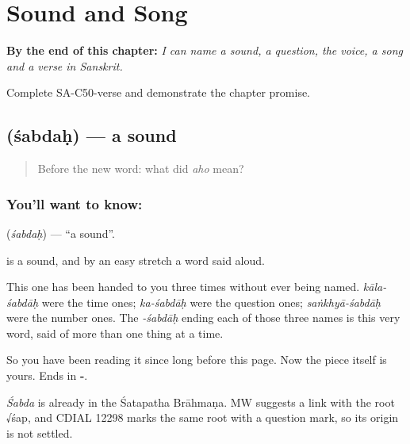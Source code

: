 
\chapter{Sound and Song}
\label{ch:sa-sound-and-song}

\begin{chapteropening}
\textbf{By the end of this chapter:} \emph{I can name a sound, a question, the voice, a song and a verse in Sanskrit.}

Complete SA-C50-verse and demonstrate the chapter promise.
\end{chapteropening}

\section[\texorpdfstring{\sk{शब्दः} (śabdaḥ)}{शब्दः (śabdaḥ)}]{ (śabdaḥ) — a sound}

\label{lesson:SA-C50-sound}



\begin{quote}
Before the new word: what did \emph{aho} mean?
\end{quote}

\subsection*{You'll want to know: }
\textbf{} (\emph{śabdaḥ}) — \textquotedblleft{}a sound\textquotedblright{}.

\textbf{} is a sound, and by an easy stretch a word said aloud.

This one has been handed to you three times without ever being named. \emph{kāla-śabdāḥ} were the time ones; \emph{ka-śabdāḥ} were the question ones; \emph{saṅkhyā-śabdāḥ} were the number ones. The \emph{-śabdāḥ} ending each of those three names is this very word, said of more than one thing at a time.

So you have been reading it since long before this page. Now the piece itself is yours. Ends in \textbf{-}.

\begin{cousinweb}
\emph{Śabda} is already in the Śatapatha Brāhmaṇa. MW suggests a link with the root √śap, and CDIAL 12298 marks the same root with a question mark, so its origin is not settled.
\end{cousinweb}

